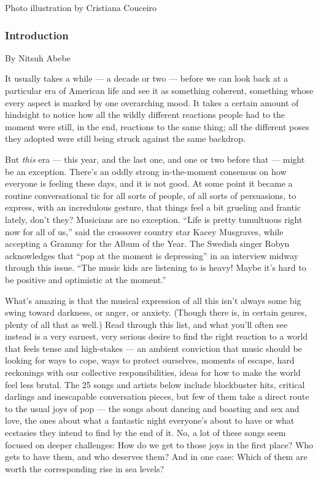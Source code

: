 Photo illustration by Cristiana Couceiro

\hypertarget{introduction}{%
\subsubsection{Introduction}\label{introduction}}

By Nitsuh Abebe

It usually takes a while --- a decade or two --- before we can look back
at a particular era of American life and see it as something coherent,
something whose every aspect is marked by one overarching mood. It takes
a certain amount of hindsight to notice how all the wildly different
reactions people had to the moment were still, in the end, reactions to
the same thing; all the different poses they adopted were still being
struck against the same backdrop.

But \emph{this} era --- this year, and the last one, and one or two
before that --- might be an exception. There's an oddly strong
in-the-moment consensus on how everyone is feeling these days, and it is
not good. At some point it became a routine conversational tic for all
sorts of people, of all sorts of persuasions, to express, with an
incredulous gesture, that things feel a bit grueling and frantic lately,
don't they? Musicians are no exception. ``Life is pretty tumultuous
right now for all of us,'' said the crossover country star Kacey
Musgraves, while accepting a Grammy for the Album of the Year. The
Swedish singer Robyn acknowledges that ``pop at the moment is
depressing'' in an interview midway through this issue. ``The music kids
are listening to is heavy! Maybe it's hard to be positive and optimistic
at the moment.''

What's amazing is that the musical expression of all this isn't always
some big swing toward darkness, or anger, or anxiety. (Though there is,
in certain genres, plenty of all that as well.) Read through this list,
and what you'll often see instead is a very earnest, very serious desire
to find the right reaction to a world that feels tense and high-stakes
--- an ambient conviction that music should be looking for ways to cope,
ways to protect ourselves, moments of escape, hard reckonings with our
collective responsibilities, ideas for how to make the world feel less
brutal. The 25 songs and artists below include blockbuster hits,
critical darlings and inescapable conversation pieces, but few of them
take a direct route to the usual joys of pop --- the songs about dancing
and boasting and sex and love, the ones about what a fantastic night
everyone's about to have or what ecstasies they intend to find by the
end of it. No, a lot of these songs seem focused on deeper challenges:
How do we get to those joys in the first place? Who gets to have them,
and who deserves them? And in one case: Which of them are worth the
corresponding rise in sea levels?

